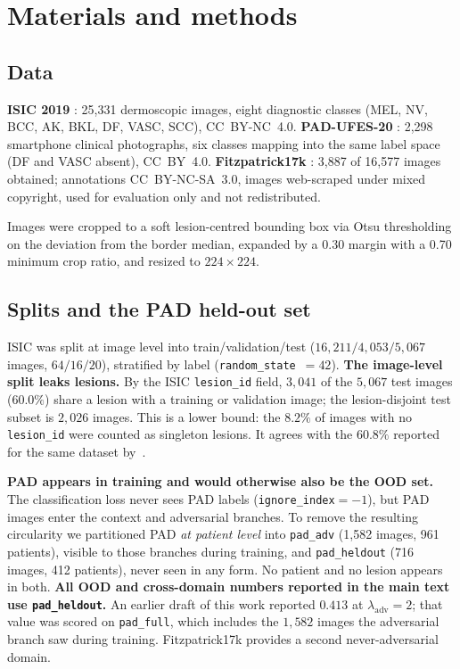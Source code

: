\documentclass[11pt,a4paper]{article}
\newcommand{\lam}{\lambda_{\mathrm{adv}}}
\begin{document}
\section{Materials and methods}

\subsection{Data}

\textbf{ISIC 2019} \cite{isic2019}: 25{,}331 dermoscopic images, eight
diagnostic classes (MEL, NV, BCC, AK, BKL, DF, VASC, SCC), CC~BY-NC~4.0.
\textbf{PAD-UFES-20} \cite{pacheco2020}: 2{,}298 smartphone clinical
photographs, six classes mapping into the same label space (DF and VASC
absent), CC~BY~4.0. \textbf{Fitzpatrick17k} \cite{groh2021}: 3{,}887 of
16{,}577 images obtained; annotations CC~BY-NC-SA~3.0, images web-scraped
under mixed copyright, used for evaluation only and not redistributed.

Images were cropped to a soft lesion-centred bounding box via Otsu
thresholding on the deviation from the border median, expanded by a 0.30
margin with a 0.70 minimum crop ratio, and resized to $224\times224$.

\subsection{Splits and the PAD held-out set}

ISIC was split at image level into train/validation/test ($16{,}211/4{,}053/5{,}067$
images, $64/16/20$), stratified by label (\texttt{random\_state}~$=42$).
\textbf{The image-level split leaks lesions.} By the ISIC \texttt{lesion\_id}
field, $3{,}041$ of the $5{,}067$ test images ($60.0\%$) share a lesion with a
training or validation image; the lesion-disjoint test subset is $2{,}026$ images.
This is a lower bound: the $8.2\%$ of images with no \texttt{lesion\_id} were
counted as singleton lesions. It agrees with the $60.8\%$ reported for the same
dataset by~\cite{leakagepaper_TODO}.

\textbf{PAD appears in training and would otherwise also be the OOD set.}
The classification loss never sees PAD labels (\texttt{ignore\_index}$=-1$),
but PAD images enter the context and adversarial branches. To remove the
resulting circularity we partitioned PAD \emph{at patient level} into
\texttt{pad\_adv} (1{,}582 images, 961 patients), visible to those branches
during training, and \texttt{pad\_heldout} (716 images, 412 patients), never
seen in any form. No patient and no lesion appears in both. \textbf{All OOD
and cross-domain numbers reported in the main text use
\texttt{pad\_heldout}.} An earlier draft of this work reported $0.413$ at $\lam = 2$;
that value was scored on \texttt{pad\_full}, which includes the $1{,}582$ images the
adversarial branch saw during training. Fitzpatrick17k provides a second never-adversarial
domain.
\end{document}
